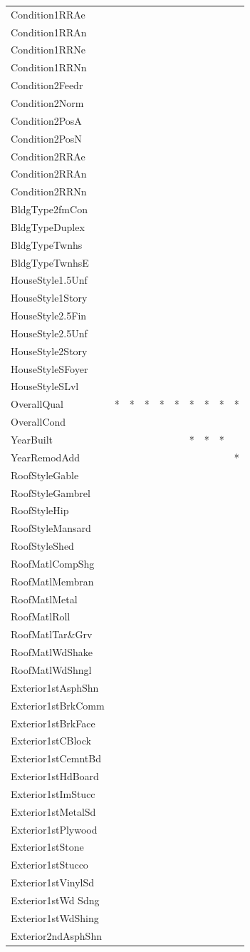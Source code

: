\documentclass[]{article}
\begin{document}
\begin{longtable}[]{@{}llllllllll@{}}
Condition1RRAe & & & & & & & & &\tabularnewline
Condition1RRAn & & & & & & & & &\tabularnewline
Condition1RRNe & & & & & & & & &\tabularnewline
Condition1RRNn & & & & & & & & &\tabularnewline
Condition2Feedr & & & & & & & & &\tabularnewline
Condition2Norm & & & & & & & & &\tabularnewline
Condition2PosA & & & & & & & & &\tabularnewline
Condition2PosN & & & & & & & & &\tabularnewline
Condition2RRAe & & & & & & & & &\tabularnewline
Condition2RRAn & & & & & & & & &\tabularnewline
Condition2RRNn & & & & & & & & &\tabularnewline
BldgType2fmCon & & & & & & & & &\tabularnewline
BldgTypeDuplex & & & & & & & & &\tabularnewline
BldgTypeTwnhs & & & & & & & & &\tabularnewline
BldgTypeTwnhsE & & & & & & & & &\tabularnewline
HouseStyle1.5Unf & & & & & & & & &\tabularnewline
HouseStyle1Story & & & & & & & & &\tabularnewline
HouseStyle2.5Fin & & & & & & & & &\tabularnewline
HouseStyle2.5Unf & & & & & & & & &\tabularnewline
HouseStyle2Story & & & & & & & & &\tabularnewline
HouseStyleSFoyer & & & & & & & & &\tabularnewline
HouseStyleSLvl & & & & & & & & &\tabularnewline
OverallQual & * & * & * & * & * & * & * & * & *\tabularnewline
OverallCond & & & & & & & & &\tabularnewline
YearBuilt & & & & & & * & * & * &\tabularnewline
YearRemodAdd & & & & & & & & & *\tabularnewline
RoofStyleGable & & & & & & & & &\tabularnewline
RoofStyleGambrel & & & & & & & & &\tabularnewline
RoofStyleHip & & & & & & & & &\tabularnewline
RoofStyleMansard & & & & & & & & &\tabularnewline
RoofStyleShed & & & & & & & & &\tabularnewline
RoofMatlCompShg & & & & & & & & &\tabularnewline
RoofMatlMembran & & & & & & & & &\tabularnewline
RoofMatlMetal & & & & & & & & &\tabularnewline
RoofMatlRoll & & & & & & & & &\tabularnewline
RoofMatlTar\&Grv & & & & & & & & &\tabularnewline
RoofMatlWdShake & & & & & & & & &\tabularnewline
RoofMatlWdShngl & & & & & & & & &\tabularnewline
Exterior1stAsphShn & & & & & & & & &\tabularnewline
Exterior1stBrkComm & & & & & & & & &\tabularnewline
Exterior1stBrkFace & & & & & & & & &\tabularnewline
Exterior1stCBlock & & & & & & & & &\tabularnewline
Exterior1stCemntBd & & & & & & & & &\tabularnewline
Exterior1stHdBoard & & & & & & & & &\tabularnewline
Exterior1stImStucc & & & & & & & & &\tabularnewline
Exterior1stMetalSd & & & & & & & & &\tabularnewline
Exterior1stPlywood & & & & & & & & &\tabularnewline
Exterior1stStone & & & & & & & & &\tabularnewline
Exterior1stStucco & & & & & & & & &\tabularnewline
Exterior1stVinylSd & & & & & & & & &\tabularnewline
Exterior1stWd Sdng & & & & & & & & &\tabularnewline
Exterior1stWdShing & & & & & & & & &\tabularnewline
Exterior2ndAsphShn & & & & & & & & &\tabularnewline

\end{longtable}
\end{document}
